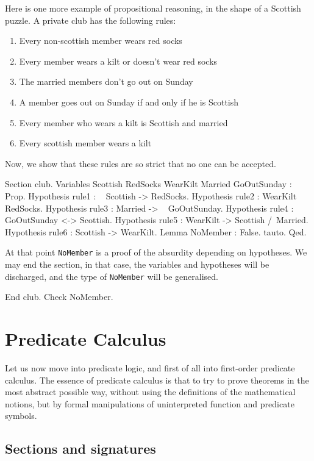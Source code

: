 \documentclass[11pt,a4paper]{book}
\begin{document}
Here is one more example of propositional reasoning, in the shape of
a Scottish puzzle. A private club has the following rules:
\begin{enumerate}
\item Every non-scottish member wears red socks
\item Every member wears a kilt or doesn't wear red socks
\item The married members don't go out on Sunday
\item A member goes out on Sunday if and only if he is Scottish
\item Every member who wears a kilt is Scottish and married
\item Every scottish member wears a kilt
\end{enumerate}
Now, we show that these rules are so strict that no one can be accepted.
\begin{coq_example}
Section club.
Variables Scottish RedSocks WearKilt Married GoOutSunday : Prop.
Hypothesis rule1 : ~ Scottish -> RedSocks.
Hypothesis rule2 : WearKilt \/ ~ RedSocks.
Hypothesis rule3 : Married -> ~ GoOutSunday.
Hypothesis rule4 : GoOutSunday <-> Scottish.
Hypothesis rule5 : WearKilt -> Scottish /\ Married.
Hypothesis rule6 : Scottish -> WearKilt.
Lemma NoMember : False.
tauto.
Qed.
\end{coq_example}
At that point \verb:NoMember: is a proof of the absurdity depending on
hypotheses.
We may end the section, in that case, the variables and hypotheses
will be discharged, and the type of \verb:NoMember: will be
generalised.

\begin{coq_example}
End club.
Check NoMember.
\end{coq_example}

\section{Predicate Calculus}

Let us now move into predicate logic, and first of all into first-order
predicate calculus. The essence of predicate calculus is that to try to prove
theorems in the most abstract possible way, without using the definitions of
the mathematical notions, but by formal manipulations of uninterpreted
function and predicate symbols.

\subsection{Sections and signatures}
\end{document}
